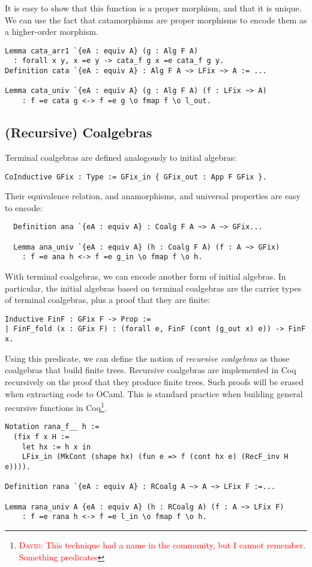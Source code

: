 \documentclass[a4paper, UKenglish, cleveref, autoref, thm-restate]{lipics-v2021}
\newcommand{\dcas}[1]{\textcolor{red}{\textsc{David}: #1}}
\begin{document}
It is easy to show that this function is a proper morphism, and that it is
unique. We can use the fact that catamorphisms are proper morphisms to encode
them as a higher-order morphism.
\begin{verbatim}
Lemma cata_arr1 `{eA : equiv A} (g : Alg F A)
  : forall x y, x =e y -> cata_f g x =e cata_f g y.
Definition cata `{eA : equiv A} : Alg F A ~> LFix ~> A := ...

Lemma cata_univ `{eA : equiv A} (g : Alg F A) (f : LFix ~> A)
    : f =e cata g <-> f =e g \o fmap f \o l_out.
\end{verbatim}

\subsection{(Recursive) Coalgebras}

Terminal coalgebras are defined analogously to initial algebras:
\begin{verbatim}
CoInductive GFix : Type := GFix_in { GFix_out : App F GFix }.
\end{verbatim}

Their equivalence relation, and anamorphisms, and universal properties are
easy to encode:
\begin{verbatim}
  Definition ana `{eA : equiv A} : Coalg F A ~> A ~> GFix...

  Lemma ana_univ `{eA : equiv A} (h : Coalg F A) (f : A ~> GFix)
    : f =e ana h <-> f =e g_in \o fmap f \o h.
\end{verbatim}

With terminal coalgebras, we can encode another form of initial algebras. In
particular, the initial algebras based on terminal coalgebras are the carrier
types of terminal coalgebras, plus a proof that they are finite:

\begin{verbatim}
Inductive FinF : GFix F -> Prop :=
| FinF_fold (x : GFix F) : (forall e, FinF (cont (g_out x) e)) -> FinF x.
\end{verbatim}

Using this predicate, we can define the notion of \emph{recursive coalgebras}
as those coalgebras that build finite trees. Recursive coalgebras are
implemented in Coq recursively on the proof that they produce finite trees.
Such proofs will be erased when extracting code to OCaml. This is standard
practice when building general recursive functions in Coq\footnote{\dcas{This
technique had a name in the community, but I cannot remember. Something
predicates}}.
\begin{verbatim}
Notation rana_f__ h :=
  (fix f x H :=
    let hx := h x in
    LFix_in (MkCont (shape hx) (fun e => f (cont hx e) (RecF_inv H e)))).

Definition rana `{eA : equiv A} : RCoalg A ~> A ~> LFix F :=...

Lemma rana_univ A {eA : equiv A} (h : RCoalg A) (f : A ~> LFix F)
    : f =e rana h <-> f =e l_in \o fmap f \o h.
\end{verbatim}
\end{document}
